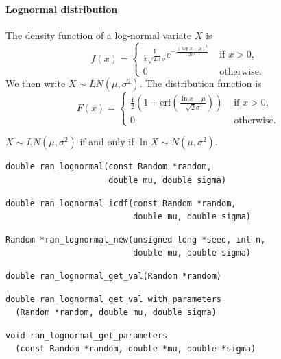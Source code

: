 
\paragraph{Lognormal distribution}

The density function of a log-normal variate $X$ is
\[
f(x) =
\begin{cases}
\frac{1}{x \sqrt{2\pi} \sigma} e^{ -\frac{ ( \log x - \mu )^2
}{2\sigma^2} } & \text{ if } x > 0, \\
0 & \text{ otherwise.}
\end{cases}
\]
We then write $X \sim LN(\mu, \sigma^2)$. The distribution function is
\[
F(x) =
\begin{cases}
\frac{1}{2} \left( 1 + \text{erf} \left( \frac{\ln x -
 \mu}{\sqrt{2}\sigma} \right) \right)
 & \text{ if } x > 0, \\
0 & \text{ otherwise.}
\end{cases}
\]

$X \sim LN(\mu, \sigma^2)$ if and only if $\ln X \sim N(\mu, \sigma^2)$.

\begin{verbatim}
double ran_lognormal(const Random *random,
                     double mu, double sigma)
\end{verbatim}

\begin{verbatim}
double ran_lognormal_icdf(const Random *random,
                          double mu, double sigma)
\end{verbatim}

\begin{verbatim}
Random *ran_lognormal_new(unsigned long *seed, int n,
                          double mu, double sigma)
\end{verbatim}

\begin{verbatim}
double ran_lognormal_get_val(Random *random)
\end{verbatim}

\begin{verbatim}
double ran_lognormal_get_val_with_parameters
  (Random *random, double mu, double sigma)
\end{verbatim}

\begin{verbatim}
void ran_lognormal_get_parameters
  (const Random *random, double *mu, double *sigma)
\end{verbatim}

